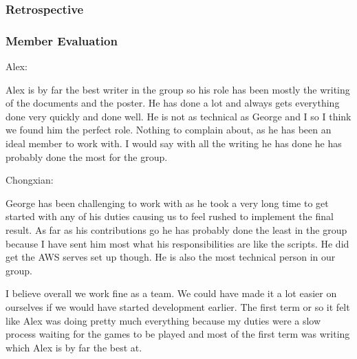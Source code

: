\documentclass[letterpaper, 10pt,titlepage]{article}
\begin{document}
\subsubsection{Retrospective}


\subsubsection{Member Evaluation}
Alex: 
\par Alex is by far the best writer in the group so his role has been mostly the writing of the documents and the poster.  He has done a lot and always gets everything done very quickly and done well.  He is not as technical as George and I so I think we found him the perfect role. Nothing to complain about, as he has been an ideal member to work with. I would say with all the writing he has done he has probably done the most for the group.

Chongxian: 
\par George has been challenging to work with as he took a very long time to get started with any of his duties causing us to feel rushed to implement the final result. As far as his contributions go he has probably done the least in the group because I have sent him most what his responsibilities are like the scripts. He did get the AWS serves set up though. He is also the most technical person in our group. 

\par I believe overall we work fine as a team. We could have made it a lot easier on ourselves if we would have started development earlier.  The first term or so it felt like Alex was doing pretty much everything because my duties were a slow process waiting for the games to be played and most of the first term was writing which Alex is by far the best at.
\end{document}
